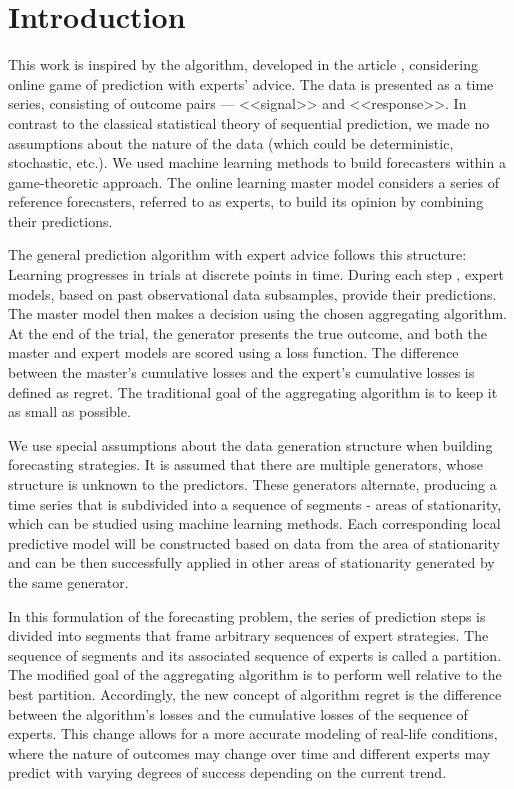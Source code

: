 \documentclass[12pt, twoside]{article}
\begin{document}
\maketitle

\section{Introduction}
This work is inspired by the algorithm, developed in the article \cite{article}, considering online game of prediction with experts' advice. The data is presented as a time series, consisting of outcome pairs --- <<signal>> and <<response>>. 
In contrast to the classical statistical theory of sequential prediction, we made no assumptions about the nature of the data (which could be deterministic, stochastic, etc.). 
We used machine learning methods to build forecasters within a game-theoretic approach.
The online learning master model considers a series of reference forecasters, referred to as experts, to build its opinion by combining their predictions.


The general prediction algorithm with expert advice follows this structure:
Learning progresses in trials at discrete points in time. 
During each step , expert models, based on past observational data subsamples, provide their predictions. 
The master model then makes a decision using the chosen aggregating algorithm. 
At the end of the trial, the generator presents the true outcome, and both the master and expert models are scored using a loss function. 
The difference between the master's cumulative losses and the expert's cumulative losses is defined as regret.
The traditional goal of the aggregating algorithm is to keep it as small as possible.

We use special assumptions about the data generation structure when building forecasting strategies. It is assumed that there are multiple generators, whose structure is unknown to the predictors. These generators alternate, producing a time series that is subdivided into a sequence of segments - areas of stationarity, which can be studied using machine learning methods. Each corresponding local predictive model will be constructed based on data from the area of stationarity and can be then successfully applied in other areas of stationarity generated by the same generator.

In this formulation of the forecasting problem, the series of prediction steps is divided into segments that frame arbitrary sequences of expert strategies. The sequence of segments and its associated sequence of experts is called a partition. The modified goal of the aggregating algorithm is to perform well relative to the best partition. Accordingly, the new concept of algorithm regret is the difference between the algorithm's losses and the cumulative losses of the sequence of experts. This change allows for a more accurate modeling of real-life conditions, where the nature of outcomes may change over time and different experts may predict with varying degrees of success depending on the current trend. 
\end{document}
